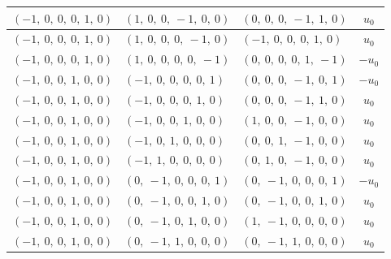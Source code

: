 \documentclass[11pt]{article}
\theoremstyle{definition}
\begin{document}
\begin{longtable}{|l|l|l|c|}
    \hline
    $\left( -1, \  0, \  0, \  0, \  1, \  0\right)$ & $\left( 1, \  0, \  0, \  -1, \  0, \  0\right)$ & $\left( 0, \  0, \  0, \  -1, \  1, \  0\right)$ & $u_{0}$ \\
    \hline
    $\left( -1, \  0, \  0, \  0, \  1, \  0\right)$ & $\left( 1, \  0, \  0, \  0, \  -1, \  0\right)$ & $\left( -1, \  0, \  0, \  0, \  1, \  0\right)$ & $u_{0}$ \\
    \hline
    $\left( -1, \  0, \  0, \  0, \  1, \  0\right)$ & $\left( 1, \  0, \  0, \  0, \  0, \  -1\right)$ & $\left( 0, \  0, \  0, \  0, \  1, \  -1\right)$ & $- u_{0}$ \\
    \hline
    $\left( -1, \  0, \  0, \  1, \  0, \  0\right)$ & $\left( -1, \  0, \  0, \  0, \  0, \  1\right)$ & $\left( 0, \  0, \  0, \  -1, \  0, \  1\right)$ & $- u_{0}$ \\
    \hline
    $\left( -1, \  0, \  0, \  1, \  0, \  0\right)$ & $\left( -1, \  0, \  0, \  0, \  1, \  0\right)$ & $\left( 0, \  0, \  0, \  -1, \  1, \  0\right)$ & $u_{0}$ \\
    \hline
    $\left( -1, \  0, \  0, \  1, \  0, \  0\right)$ & $\left( -1, \  0, \  0, \  1, \  0, \  0\right)$ & $\left( 1, \  0, \  0, \  -1, \  0, \  0\right)$ & $u_{0}$ \\
    \hline
    $\left( -1, \  0, \  0, \  1, \  0, \  0\right)$ & $\left( -1, \  0, \  1, \  0, \  0, \  0\right)$ & $\left( 0, \  0, \  1, \  -1, \  0, \  0\right)$ & $u_{0}$ \\
    \hline
    $\left( -1, \  0, \  0, \  1, \  0, \  0\right)$ & $\left( -1, \  1, \  0, \  0, \  0, \  0\right)$ & $\left( 0, \  1, \  0, \  -1, \  0, \  0\right)$ & $u_{0}$ \\
    \hline
    $\left( -1, \  0, \  0, \  1, \  0, \  0\right)$ & $\left( 0, \  -1, \  0, \  0, \  0, \  1\right)$ & $\left( 0, \  -1, \  0, \  0, \  0, \  1\right)$ & $- u_{0}$ \\
    \hline
    $\left( -1, \  0, \  0, \  1, \  0, \  0\right)$ & $\left( 0, \  -1, \  0, \  0, \  1, \  0\right)$ & $\left( 0, \  -1, \  0, \  0, \  1, \  0\right)$ & $u_{0}$ \\
    \hline
    $\left( -1, \  0, \  0, \  1, \  0, \  0\right)$ & $\left( 0, \  -1, \  0, \  1, \  0, \  0\right)$ & $\left( 1, \  -1, \  0, \  0, \  0, \  0\right)$ & $u_{0}$ \\
    \hline
    $\left( -1, \  0, \  0, \  1, \  0, \  0\right)$ & $\left( 0, \  -1, \  1, \  0, \  0, \  0\right)$ & $\left( 0, \  -1, \  1, \  0, \  0, \  0\right)$ & $u_{0}$ \\

\end{longtable}
\end{document}
